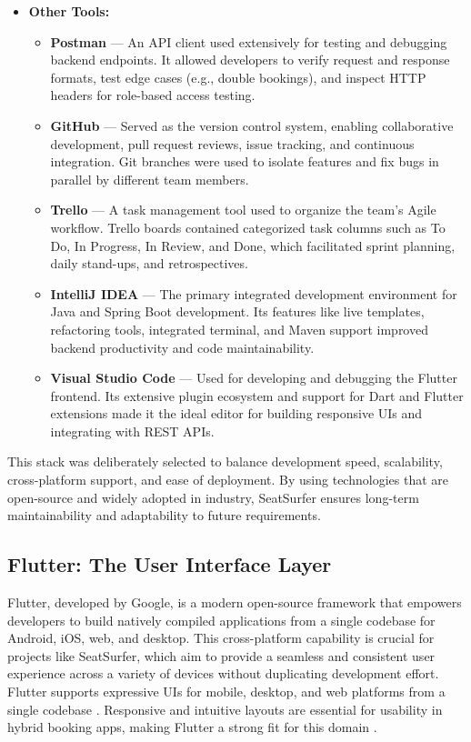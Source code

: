 \documentclass[12pt,a4paper]{report} %
\begin{document}
\begin{itemize}
    \item \textbf{Other Tools:}
    \begin{itemize}
        \item \textbf{Postman} — An API client used extensively for testing and debugging backend endpoints. It allowed developers to verify request and response formats, test edge cases (e.g., double bookings), and inspect HTTP headers for role-based access testing.
        
        \item \textbf{GitHub} — Served as the version control system, enabling collaborative development, pull request reviews, issue tracking, and continuous integration. Git branches were used to isolate features and fix bugs in parallel by different team members.
        
        \item \textbf{Trello} — A task management tool used to organize the team's Agile workflow. Trello boards contained categorized task columns such as To Do, In Progress, In Review, and Done, which facilitated sprint planning, daily stand-ups, and retrospectives.
        
        \item \textbf{IntelliJ IDEA} — The primary integrated development environment for Java and Spring Boot development. Its features like live templates, refactoring tools, integrated terminal, and Maven support improved backend productivity and code maintainability.
        
        \item \textbf{Visual Studio Code} — Used for developing and debugging the Flutter frontend. Its extensive plugin ecosystem and support for Dart and Flutter extensions made it the ideal editor for building responsive UIs and integrating with REST APIs.
    \end{itemize}
\end{itemize}

This stack was deliberately selected to balance development speed, scalability, cross-platform support, and ease of deployment. By using technologies that are open-source and widely adopted in industry, SeatSurfer ensures long-term maintainability and adaptability to future requirements.

\subsection{Flutter: The User Interface Layer}

Flutter, developed by Google, is a modern open-source framework that empowers developers to build natively compiled applications from a single codebase for Android, iOS, web, and desktop. This cross-platform capability is crucial for projects like SeatSurfer, which aim to provide a seamless and consistent user experience across a variety of devices without duplicating development effort. Flutter supports expressive UIs for mobile, desktop, and web platforms from a single codebase \cite{google2022flutter}. Responsive and intuitive layouts are essential for usability in hybrid booking apps, making Flutter a strong fit for this domain \cite{verma2023flutter}.
\end{document}
